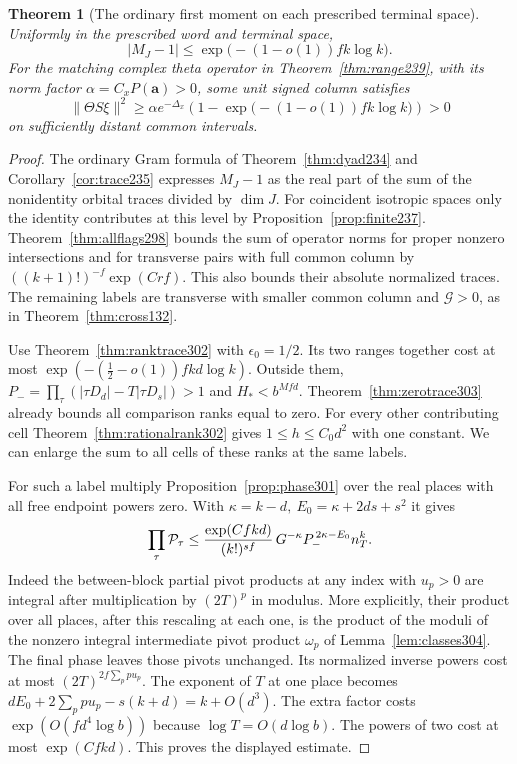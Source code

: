 \documentclass[a4paper,11pt]{article}
\newtheorem{theorem}[proposition]{Theorem}
\theoremstyle{definition}
\theoremstyle{remark}
\numberwithin{equation}{section}
\begin{document}
\begin{theorem}[The ordinary first moment on each prescribed terminal space]\leavevmode
\label{thm:ordinarymoment304}
Uniformly in the prescribed word and terminal space,
\[
          |M_J-1|\le\exp\bigl(-(1-o(1))fk\log k\bigr).
\]
For the matching complex theta operator in
Theorem~\ref{thm:range239}, with its norm factor
\(\alpha=C_xP(\mathbf a)>0\), some unit signed column satisfies
\[
   \|\Theta S\xi\|^2\ge
          \alpha e^{-\Delta_x}
          \left(1-\exp\bigl(-(1-o(1))fk\log k\bigr)\right)>0
\]
on sufficiently distant common intervals.
\end{theorem}
\begin{proof}
The ordinary Gram formula of Theorem~\ref{thm:dyad234} and
Corollary~\ref{cor:trace235} expresses \(M_J-1\) as the
real part of the sum of the nonidentity orbital traces
divided by \(\dim J\). For coincident isotropic spaces
only the identity contributes at this level by
Proposition~\ref{prop:finite237}. Theorem~\ref{thm:allflags298}
bounds the sum of operator norms for proper nonzero
intersections and for transverse pairs with full common
column by \(((k+1)!)^{-f}\exp(Crf)\). This also bounds
their absolute normalized traces. The remaining labels
are transverse with smaller common column and
\(\mathcal G>0\), as in Theorem~\ref{thm:cross132}.

Use Theorem~\ref{thm:ranktrace302} with \(\epsilon_0=1/2\).
Its two ranges together cost at most
\(\exp(-(\tfrac12-o(1))fkd\log k)\). Outside them,
\(P_-=\prod_\tau (|\tau D_d|-T|\tau D_s|)>1\)
and \(H_*<b^{Mfd}\). Theorem~\ref{thm:zerotrace303} already
bounds all comparison ranks equal to zero. For every other
contributing cell Theorem~\ref{thm:rationalrank302} gives
\(1\le h\le C_0d^2\) with one constant. We can enlarge
the sum to all cells of these ranks at the same labels.

For such a label multiply Proposition~\ref{prop:phase301}
over the real places with all free endpoint powers zero.
With \(\kappa=k-d,\ E_0=\kappa+2ds+s^2\) it gives
\[
 \prod_\tau{\cal P}_\tau\le
   \frac{\exp(Cfkd)}{(k!)^{sf}}\,
                   G^{-\kappa}P_-^{\,2\kappa-E_0} n_T^k .
\]
Indeed the between-block partial pivot products at any
index with \(u_p>0\) are integral after multiplication by
\((2T)^p\) in modulus. More explicitly, their product over
all places, after this rescaling at each one, is the
product of the moduli of the nonzero integral intermediate
pivot product \(\omega_p\) of Lemma~\ref{lem:classes304}.
The final phase leaves those pivots unchanged. Its normalized
inverse powers cost at most \((2T)^{2f\sum_p p u_p}\).
The exponent of \(T\) at one place becomes
\(dE_0+2\sum_p p u_p-s(k+d)=k+O(d^3)\).
The extra factor costs \(\exp(O(fd^4\log b))\) because
\(\log T=O(d\log b)\). The powers of two cost at most
\(\exp(Cfkd)\). This proves the displayed estimate.


\end{proof}
\end{document}
